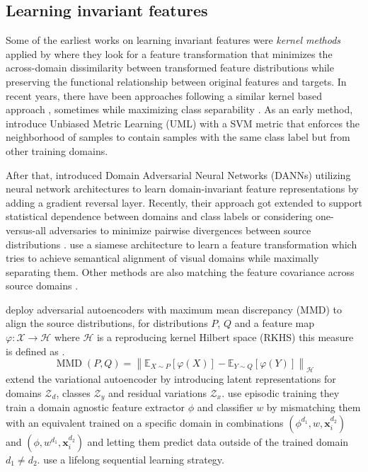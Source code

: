 \subsection{Learning invariant features}

Some of the earliest works on learning invariant features were \emph{kernel methods} applied by \citet{MuandetBS13}  where they look for a feature transformation that minimizes the across-domain dissimilarity between transformed feature distributions while preserving the functional relationship between original features and targets. In recent years, there have been approaches following a similar kernel based approach \citep{LiGTLT18, LiTGLLZT18}, sometimes while maximizing class separability \citep{Hu0CC19, GhifaryBKZ17}. As an early method, \citet{FangXR13} introduce Unbiased Metric Learning (UML) with a SVM metric that enforces the neighborhood of samples to contain samples with the same class label but from other training domains.

After that, \citet{GaninUAGLLML16} introduced Domain Adversarial Neural Networks (DANNs) utilizing neural network architectures to learn domain-invariant feature representations by adding a gradient reversal layer. Recently, their approach got extended to support statistical dependence between domains and class labels \citep{AkuzawaIM19} or considering one-versus-all adversaries to minimize pairwise divergences between source distributions \citep{albuquerque2019generalizing}. \citet{MotiianPAD17} use a siamese architecture to learn a feature transformation which tries to achieve semantical alignment of visual domains while maximally separating them. Other methods are also matching the feature covariance across source domains \citep{RahmanFBS20}.

\citet{LiPWK18} deploy adversarial autoencoders with maximum mean discrepancy (MMD) \citep{GrettonBRSS12} to align the source distributions, \ie for distributions $P$, $Q$ and a feature map $\varphi: \mathcal{X} \rightarrow \mathcal{H}$ where $\mathcal{H}$ is a reproducing kernel Hilbert space (RKHS) this measure is defined as .
\begin{equation}
\label{eq:mmd}
    \operatorname{MMD}(P, Q)=\left\|\mathbb{E}_{X \sim P}[\varphi(X)]-\mathbb{E}_{Y \sim Q}[\varphi(Y)]\right\|_{\mathcal{H}}
\end{equation}
\citet{ilse2019diva} extend the variational autoencoder \citep{KingmaW13} by introducing latent representations for domains $\mathcal{Z}_d$, classes $\mathcal{Z}_y$ and residual variations $\mathcal{Z}_x$. \citet{LiZYLSH19} use episodic training \ie they train a domain agnostic feature extractor $\phi$ and classifier $w$ by mismatching them with an equivalent trained on a specific domain in combinations $(\phi^{d_1}, w, \mathbf{x}^{d_2}_i)$ and $(\phi, w^{d_1}, \mathbf{x}^{d_2}_i)$ and letting them predict data outside of the trained domain $d_1 \neq d_2$. \citet{li2020sequential} use a lifelong sequential learning strategy.

